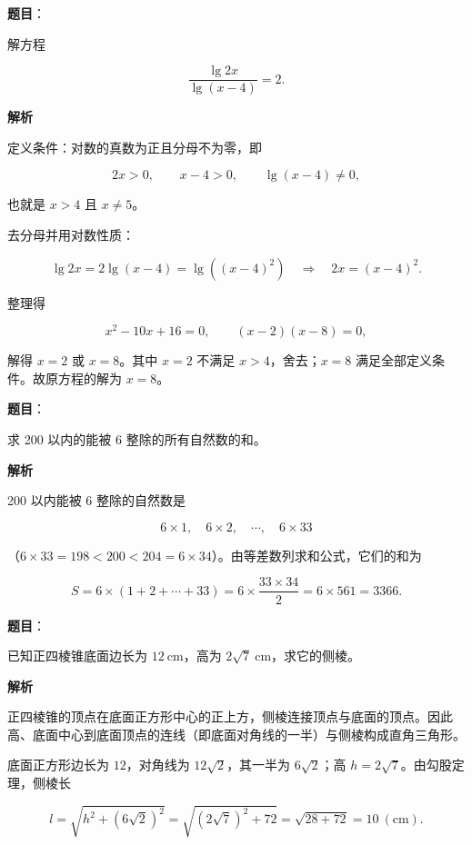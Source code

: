 \begin{answer}

\textbf{题目}：

解方程

\nopagebreak[4]
\[
\frac{\lg 2x}{\lg(x-4)}=2.
\]

\textbf{解析}

定义条件：对数的真数为正且分母不为零，即

\nopagebreak[4]
\[
2x>0,\qquad x-4>0,\qquad \lg(x-4)\ne0,
\]

也就是 $x>4$ 且 $x\ne5$。

去分母并用对数性质：

\nopagebreak[4]
\[
\lg 2x=2\lg(x-4)=\lg\left((x-4)^{2}\right)
\quad\Longrightarrow\quad
2x=(x-4)^{2}.
\]

整理得

\nopagebreak[4]
\[
x^{2}-10x+16=0,
\qquad
(x-2)(x-8)=0,
\]

解得 $x=2$ 或 $x=8$。其中 $x=2$ 不满足 $x>4$，舍去；$x=8$ 满足全部定义条件。故原方程的解为 $x=8$。


\end{answer}
\begin{answer}

\textbf{题目}：

求 200 以内的能被 6 整除的所有自然数的和。

\textbf{解析}

200 以内能被 6 整除的自然数是

\nopagebreak[4]
\[
6\times1,\quad 6\times2,\quad \cdots,\quad 6\times33
\]

（$6\times33=198<200<204=6\times34$）。由等差数列求和公式，它们的和为

\nopagebreak[4]
\[
S=6\times(1+2+\cdots+33)
=6\times\frac{33\times34}{2}
=6\times561=3366.
\]


\end{answer}
\begin{answer}

\textbf{题目}：

已知正四棱锥底面边长为 $12\ \mathrm{cm}$，高为 $2\sqrt{7}\ \mathrm{cm}$，求它的侧棱。

\textbf{解析}

正四棱锥的顶点在底面正方形中心的正上方，侧棱连接顶点与底面的顶点。因此高、底面中心到底面顶点的连线（即底面对角线的一半）与侧棱构成直角三角形。

底面正方形边长为 $12$，对角线为 $12\sqrt2$，其一半为 $6\sqrt2$；高 $h=2\sqrt7$。由勾股定理，侧棱长

\nopagebreak[4]
\[
l=\sqrt{h^{2}+\left(6\sqrt2\right)^{2}}
=\sqrt{(2\sqrt7)^{2}+72}
=\sqrt{28+72}=10\ (\mathrm{cm}).
\]


\end{answer}
